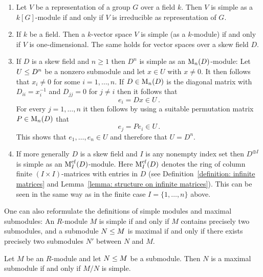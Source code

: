 \begin{example}
  \label{example: simple modules}
  \leavevmode
  \begin{enumerate}
    \item
      Let $V$ be a representation of a group $G$ over a field $k$.
      Then $V$ is simple as a $k[G]$-module if and only if $V$ is irreducible as representation of $G$.
    \item
      If $k$ be a field.
      Then a $k$-vector space $V$ is simple (as a $k$-module) if and only if $V$ is one-dimensional.
      The same holds for vector spaces over a skew field $D$.
    \item
      If $D$ is a skew field and $n \geq 1$ then $D^n$ is simple as an $\operatorname{M}_n(D)$-module:
      Let $U \leq D^n$ be a nonzero submodule and let $x \in U$ with $x \neq 0$.
      It then follows that $x_i \neq 0$ for some $i = 1, \dotsc, n$.
      If $D \in \operatorname{M}_n(D)$ is the diagonal matrix with $D_{ii} = x_i^{-1}$ and $D_{jj} = 0$ for $j \neq i$ then it follows that
      \[
            e_i
        =   D x
        \in U \,.
      \]
      For every $j = 1, \dotsc, n$ it then follows by using a suitable permutation matrix $P \in \operatorname{M}_n(D)$ that
      \[
            e_j
        =   P e_i
        \in U \,.
      \]
      This shows that $e_1, \dotsc, e_n \in U$ and therefore that $U = D^n$.
    \item
      \label{enumerate: D^I simple as a Matcf module}
      If more generally $D$ is a skew field and $I$ is any nonempty index set then $D^{\oplus I}$ is simple as an $\operatorname{M}_I^{{\operatorname{cf}}}(D)$-module.
      Here $\operatorname{M}_I^{{\operatorname{cf}}}(D)$ denotes the ring of column finite $(I \times I)$-matrices with entries in $D$ (see Definition~\ref{definition: infinite matrices} and Lemma~\ref{lemma: structure on infinite matrices}).
      This can be seen in the same way as in the finite case $I = \{1, \dotsc, n\}$ above.
  \end{enumerate}
\end{example}


\begin{remark}
  \label{remark: alternative formulation of simple and maximal}
  One can also reformulate the definitions of simple modules and maximal submodules:
  An $R$-module $M$ is simple if and only if $M$ contains precisely two submodules, and a submodule $N \leq M$ is maximal if and only if there exists precisely two submodules $N'$ between $N$ and $M$.
\end{remark}


\begin{lemma}
  \label{lemma: maximal iff quotient is simple}
  Let $M$ be an $R$-module and let $N \leq M$ be a submodule.
  Then $N$ is a maximal submodule if and only if $M/N$ is simple.
\end{lemma}


